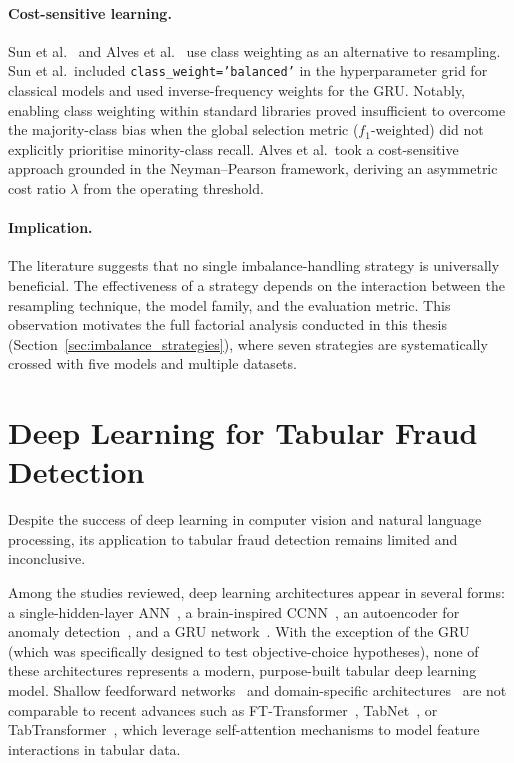 \paragraph{Cost-sensitive learning.}
Sun et al.~\cite{sun2025objective} and Alves et al.~\cite{alves2025benchmarking} use class weighting as an alternative to resampling. Sun et al.\ included \texttt{class\_weight='balanced'} in the hyperparameter grid for classical models and used inverse-frequency weights for the GRU. Notably, enabling class weighting within standard libraries proved insufficient to overcome the majority-class bias when the global selection metric ($f_1$-weighted) did not explicitly prioritise minority-class recall. Alves et al.\ took a cost-sensitive approach grounded in the Neyman--Pearson framework, deriving an asymmetric cost ratio $\lambda$ from the operating threshold.

\paragraph{Implication.}
The literature suggests that no single imbalance-handling strategy is universally beneficial. The effectiveness of a strategy depends on the interaction between the resampling technique, the model family, and the evaluation metric. This observation motivates the full factorial analysis conducted in this thesis (Section~\ref{sec:imbalance_strategies}), where seven strategies are systematically crossed with five models and multiple datasets.


\section{Deep Learning for Tabular Fraud Detection}
\label{sec:rw_deep_learning}

Despite the success of deep learning in computer vision and natural language processing, its application to tabular fraud detection remains limited and inconclusive.

Among the studies reviewed, deep learning architectures appear in several forms: a single-hidden-layer ANN~\cite{georgieva2019neural}, a brain-inspired CCNN~\cite{wu2025ccnn}, an autoencoder for anomaly detection~\cite{du2024novel, abougrad2025online}, and a GRU network~\cite{sun2025objective}. With the exception of the GRU (which was specifically designed to test objective-choice hypotheses), none of these architectures represents a modern, purpose-built tabular deep learning model. Shallow feedforward networks~\cite{georgieva2019neural, jansson2020federated} and domain-specific architectures~\cite{wu2025ccnn} are not comparable to recent advances such as FT-Transformer~\cite{gorishniy2021revisiting}, TabNet~\cite{arik2021tabnet}, or TabTransformer~\cite{huang2020tabtransformer}, which leverage self-attention mechanisms to model feature interactions in tabular data.

